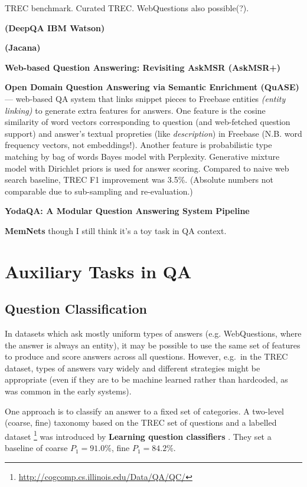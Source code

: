 TREC benchmark.  Curated TREC.  WebQuestions also possible(?).

\textbf{(DeepQA IBM Watson)} \cite{WatsonOverview}

\textbf{(Jacana)} \cite{TreeEdit2013Yao} \cite{TreeEditIR2013Yao}

\textbf{Web-based Question Answering: Revisiting AskMSR (AskMSR+)}

\textbf{Open Domain Question Answering via Semantic Enrichment (QuASE)} \cite{QuASE}
	--- web-based QA system that links snippet pieces to Freebase entities
	\textit{(entity linking)} to generate extra features for answers.
	One feature is the cosine similarity of word
	vectors corresponding to question (and web-fetched question support)
	and answer's textual propreties (like \textit{description}) in Freebase
	(N.B. word frequency vectors, not embeddings!).
	Another feature is probabilistic type matching by bag of words Bayes model
	with Perplexity.  Generative mixture model with Dirichlet priors is used
	for answer scoring.  Compared to naive web search baseline, TREC F1
	improvement was 3.5\%.  (Absolute numbers not comparable due to
	sub-sampling and re-evaluation.)

\textbf{YodaQA: A Modular Question Answering System Pipeline} \cite{YodaQAPoster2015}

\textbf{MemNets} though I still think it's a toy task in QA context.

\section{Auxiliary Tasks in QA}

\subsection{Question Classification}

In datasets which ask mostly uniform types of answers (e.g. WebQuestions,
where the answer is always an entity), it may be possible to use the same
set of features to produce and score answers across all questions.
However, e.g.\ in the TREC dataset, types of answers vary widely and
different strategies might be appropriate (even if they are to be machine
learned rather than hardcoded, as was common in the early systems).

One approach is to classify an answer to a fixed set of categories.
A two-level (coarse, fine) taxonomy based on the TREC set of questions and a labelled dataset%
\footnote{\url{http://cogcomp.cs.illinois.edu/Data/QA/QC/}}
was introduced by \textbf{Learning question classifiers} \cite{QCLearning}.
They set a baseline of coarse $P_1=91.0\%$, fine $P_1=84.2\%$.


